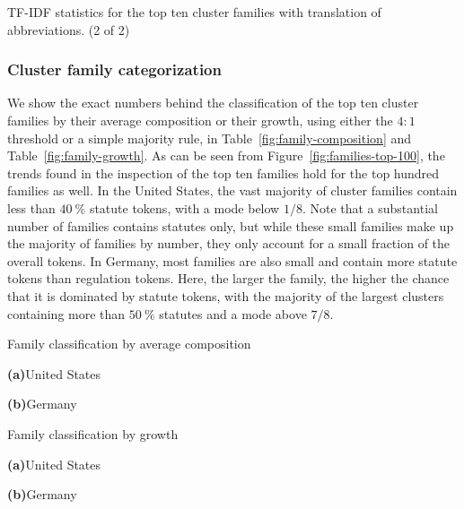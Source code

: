\documentclass[utf8,sort&compress,numbers,square,table,hidelinks]{frontiers_suppmat} %
\begin{document}
\begin{table}
	\caption{TF-IDF statistics for the top ten cluster families with translation of abbreviations. (2 of 2)}\label{tab:tfidf:part2}
	
\end{table}

\clearpage

\vspace*{6pt}
\subsubsection{Cluster family categorization}

We show the exact numbers behind the classification of the top ten cluster families by their average composition or their growth,
using either the $4:1$ threshold or a simple majority rule, 
in Table~\ref{fig:family-composition} and Table~\ref{fig:family-growth}. 
As can be seen from Figure~\ref{fig:families-top-100}, 
the trends found in the inspection of the top ten families hold for the top hundred families as well. 
In the United States, the vast majority of cluster families contain less than $40~\%$ statute tokens, with a mode below $1/8$. 
Note that a substantial number of families contains statutes only, 
but while these small families make up the majority of families by number, they only account for a small fraction of the overall tokens.
In Germany, most families are also small and contain more statute tokens than regulation tokens.
Here, the larger the family, the higher the chance that it is dominated by statute tokens,
with the majority of the largest clusters containing more than $50~\%$ statutes and a mode above $7/8$. 

\begin{table}
	\caption{Family classification by average composition}\label{fig:family-composition}
	\renewcommand{\arraystretch}{1.075}
	\small\centering
	
	
	{\vspace*{6pt}\small \textbf{\textsf{(a)}}\quad United States}\vspace*{12pt}

	
	
	{\vspace*{6pt}\small \textbf{\textsf{(b)}}\quad Germany} 
\end{table}

\begin{table}
	\caption{Family classification by growth}\label{fig:family-growth}
	\renewcommand{\arraystretch}{1.075}
	\small\centering
	
	
	{\vspace*{6pt}\small \textbf{\textsf{(a)}}\quad United States}\vspace*{12pt}

	
	
	{\vspace*{6pt}\small \textbf{\textsf{(b)}}\quad Germany} 
	\vspace*{-6pt}
\end{table}
\end{document}
